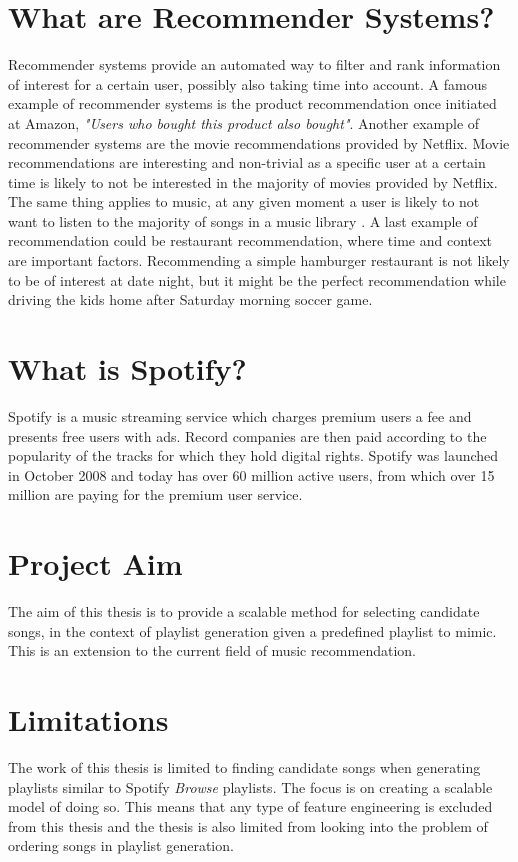 \documentclass[a4paper,11pt]{kth-mag}
\begin{document}
\section{What are Recommender Systems?}
Recommender systems provide an automated way to filter and rank information of interest for a certain user, possibly also taking time into account. A famous example of recommender systems is the product recommendation once initiated at Amazon, \textit{"Users who bought this product also bought"}. Another example of recommender systems are the movie recommendations provided by Netflix. Movie recommendations are interesting and non-trivial as a specific user at a certain time is likely to not be interested in the majority of movies provided by Netflix. The same thing applies to music, at any given moment a user is likely to not want to listen to the majority of songs in a music library . A last example of recommendation could be restaurant recommendation, where time and context are important factors. Recommending a simple hamburger restaurant is not likely to be of interest at date night, but it might be the perfect recommendation while driving the kids home after Saturday morning soccer game.

\section{What is Spotify?}
Spotify is a music streaming service which charges premium users a fee and presents free users with ads. Record companies are then paid according to the popularity of the tracks for which they hold digital rights. Spotify was launched in October 2008 and today has over 60 million active users, from which over 15 million are paying for the premium user service.

\section{Project Aim}
The aim of this thesis is to provide a scalable method for selecting candidate songs, in the context of playlist generation given a predefined playlist to mimic. This is an extension to the current field of music recommendation.  

\section{Limitations}
The work of this thesis is limited to finding candidate songs when generating playlists similar to Spotify \textit{Browse} playlists. The focus is on creating a scalable model of doing so. This means that any type of feature engineering is excluded from this thesis and the thesis is also limited from looking into the problem of ordering songs in playlist generation. 
\end{document}
